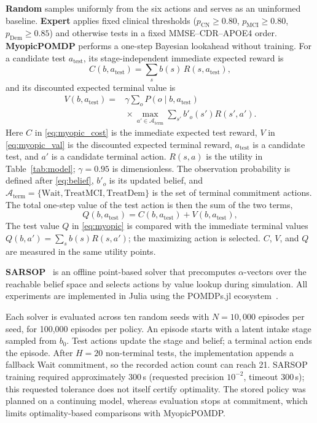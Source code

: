 \documentclass[conference,a4paper]{IEEEtran}
\begin{document}
\textbf{Random} samples uniformly from the six actions and serves as an
uninformed baseline. \textbf{Expert} applies fixed clinical
thresholds ($p_\mathrm{CN}\geq0.80$, $p_\mathrm{MCI}\geq0.80$,
$p_\mathrm{Dem}\geq0.85$) and otherwise tests in a fixed
MMSE--CDR--APOE4 order. \textbf{MyopicPOMDP} performs a one-step
Bayesian lookahead without training. For a candidate test
$a_\mathrm{test}$, its stage-independent immediate expected reward is
\begin{equation}
C(b, a_\mathrm{test}) = \sum_s b(s)\,R(s, a_\mathrm{test}),
\label{eq:myopic_cost}
\end{equation}
and its discounted expected terminal value is
\begin{equation}
\begin{aligned}
V(b,a_\mathrm{test})={}&\gamma\sum_o P(o\mid b,a_\mathrm{test})\\
&{}\times\max_{a'\in\mathcal{A}_\mathrm{term}}
\sum_{s'}b'_o(s')R(s',a').
\end{aligned}
\label{eq:myopic_val}
\end{equation}
Here $C$ in \eqref{eq:myopic_cost} is the immediate expected test
reward, $V$ in \eqref{eq:myopic_val} is the discounted expected
terminal reward, $a_\mathrm{test}$ is a candidate test, and
$a'$ is a candidate terminal action. $R(s,a)$ is the utility in
Table~\ref{tab:model}; $\gamma=0.95$ is dimensionless. The observation
probability is defined after \eqref{eq:belief}, $b'_o$ is its updated
belief, and
$\mathcal{A}_\mathrm{term} = \{\mathrm{Wait},\mathrm{TreatMCI},
\mathrm{TreatDem}\}$ is the set of terminal commitment actions. The
total one-step value of the test action is then the sum of the two
terms,
\begin{equation}
Q(b, a_\mathrm{test}) = C(b, a_\mathrm{test}) + V(b, a_\mathrm{test}),
\label{eq:myopic}
\end{equation}
The test value $Q$ in \eqref{eq:myopic} is compared with the immediate
terminal values $Q(b,a')=\sum_s b(s)R(s,a')$; the maximizing action
is selected. $C$, $V$, and $Q$ are measured in the same utility points.

\textbf{SARSOP}~\cite{kurniawati} is an offline point-based solver that
precomputes $\alpha$-vectors over the reachable belief space and selects
actions by value lookup during simulation. All experiments are
implemented in Julia using the POMDPs.jl
ecosystem~\cite{egorov2017pomdps}.

Each solver is evaluated across ten random seeds with $N=10{,}000$
episodes per seed, for 100,000 episodes per policy. An episode starts
with a latent intake stage sampled from $b_0$. Test actions update the
stage and belief; a terminal action ends the episode. After $H=20$
non-terminal tests, the implementation appends a fallback Wait
commitment, so the recorded action count can reach 21. SARSOP
training required approximately 300\,s (requested precision $10^{-2}$,
timeout 300\,s); this requested tolerance does not itself certify
optimality. The stored policy was planned on a continuing model,
whereas evaluation stops at commitment, which limits optimality-based
comparisons with MyopicPOMDP.
\end{document}
